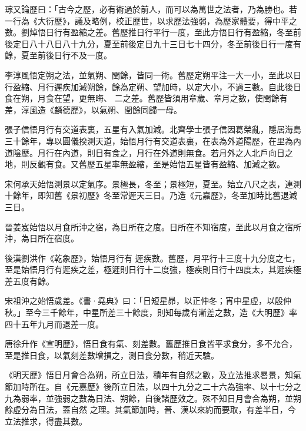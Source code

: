 \begin{pinyinscope}
 琮又論歷曰：「古今之歷，必有術過於前人，而可以為萬世之法者，乃為勝也。若一行為《大衍歷》，議及略例，校正歷世，以求歷法強弱，為歷家體要，得中平之數。劉焯悟日行有盈縮之差。舊歷推日行平行一度，至此方悟日行有盈縮，冬至前後定日八十八日八十九分，夏至前後定日九十三日七十四分，冬至前後日行一度有餘，夏至前後日行不及一度。



 李淳風悟定朔之法，並氣朔、閏餘，皆同一術。舊歷定朔平注一大一小，至此以日行盈縮、月行遲疾加減朔餘，餘為定朔、望加時，以定大小，不過三數。自此後日食在朔，月食在望，更無晦、
 二之差。舊歷皆須用章歲、章月之數，使閏餘有差，淳風造《麟德歷》，以氣朔、閏餘同歸一母。



 張子信悟月行有交道表裏，五星有入氣加減。北齊學士張子信因葛榮亂，隱居海島三十餘年，專以圓儀揆測天道，始悟月行有交道表裏，在表為外道陽歷，在里為內道陰歷。月行在內道，則日有食之，月行在外道則無食。若月外之人北戶向日之地，則反觀有食。又舊歷五星率無盈縮，至是始悟五星皆有盈縮、加減之數。



 宋何承天始悟測景以定氣序。景極長，冬至；景極短，夏至。始立八尺之表，連測十餘年，即知舊《景初歷》冬至常遲天三日。乃造《元嘉歷》，冬至加時比舊退減三日。



 晉姜岌始悟以月食所沖之宿，為日所在之度。日所在不知宿度，至此以月食之宿所沖，為日所在宿度。



 後漢劉洪作《乾象歷》，始悟月行有
 遲疾數。舊歷，月平行十三度十九分度之七，至是始悟月行有遲疾之差，極遲則日行十二度強，極疾則日行十四度太，其遲疾極差五度有餘。



 宋祖沖之始悟歲差。《書·堯典》曰：「日短星昴，以正仲冬；宵中星虛，以殷仲秋。」至今三千餘年，中星所差三十餘度，則知每歲有漸差之數，造《大明歷》率四十五年九月而退差一度。



 唐徐升作《宣明歷》，悟日食有氣、刻差數。舊歷推日食皆平求食分，多不允合，至是推日食，以氣刻差數增損之，測日食分數，稍近天驗。



 《明天歷》悟日月會合為朔，所立日法，積年有自然之數，及立法推求晷景，知氣節加時所在。自《元嘉歷》後所立日法，以四十九分之二十六為強率、以十七分之九為弱率，並強弱之數為日法、朔餘，自後諸歷效之。殊不知日月會合為朔，並朔餘虛分為日法，蓋自然
 之理。其氣節加時，晉、漢以來約而要取，有差半日，今立法推求，得盡其數。




\end{pinyinscope}
